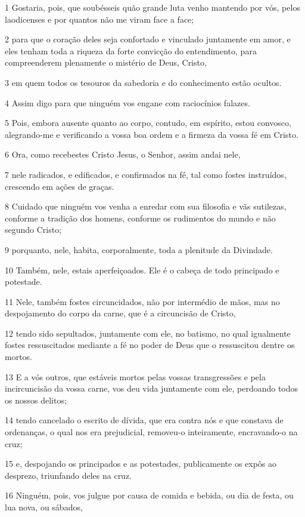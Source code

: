 \par 1 Gostaria, pois, que soubésseis quão grande luta venho mantendo por vós, pelos laodicenses e por quantos não me viram face a face;
\par 2 para que o coração deles seja confortado e vinculado juntamente em amor, e eles tenham toda a riqueza da forte convicção do entendimento, para compreenderem plenamente o mistério de Deus, Cristo,
\par 3 em quem todos os tesouros da sabedoria e do conhecimento estão ocultos.
\par 4 Assim digo para que ninguém vos engane com raciocínios falazes.
\par 5 Pois, embora ausente quanto ao corpo, contudo, em espírito, estou convosco, alegrando-me e verificando a vossa boa ordem e a firmeza da vossa fé em Cristo.
\par 6 Ora, como recebestes Cristo Jesus, o Senhor, assim andai nele,
\par 7 nele radicados, e edificados, e confirmados na fé, tal como fostes instruídos, crescendo em ações de graças.
\par 8 Cuidado que ninguém vos venha a enredar com sua filosofia e vãs sutilezas, conforme a tradição dos homens, conforme os rudimentos do mundo e não segundo Cristo;
\par 9 porquanto, nele, habita, corporalmente, toda a plenitude da Divindade.
\par 10 Também, nele, estais aperfeiçoados. Ele é o cabeça de todo principado e potestade.
\par 11 Nele, também fostes circuncidados, não por intermédio de mãos, mas no despojamento do corpo da carne, que é a circuncisão de Cristo,
\par 12 tendo sido sepultados, juntamente com ele, no batismo, no qual igualmente fostes ressuscitados mediante a fé no poder de Deus que o ressuscitou dentre os mortos.
\par 13 E a vós outros, que estáveis mortos pelas vossas transgressões e pela incircuncisão da vossa carne, vos deu vida juntamente com ele, perdoando todos os nossos delitos;
\par 14 tendo cancelado o escrito de dívida, que era contra nós e que constava de ordenanças, o qual nos era prejudicial, removeu-o inteiramente, encravando-o na cruz;
\par 15 e, despojando os principados e as potestades, publicamente os expôs ao desprezo, triunfando deles na cruz.
\par 16 Ninguém, pois, vos julgue por causa de comida e bebida, ou dia de festa, ou lua nova, ou sábados,
